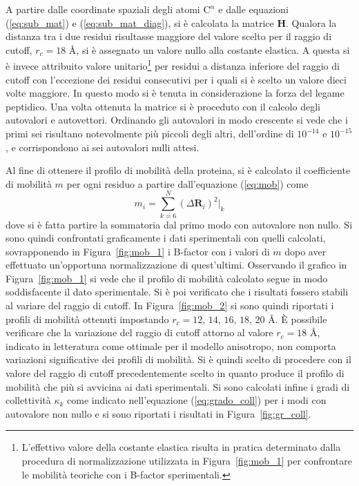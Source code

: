 A partire dalle coordinate spaziali degli atomi $ \mathrm{C}^{\alpha} $ e dalle equazioni (\ref{eq:sub_mat}) e (\ref{eq:sub_mat_diag}), si è calcolata la matrice $ \mathbf{H} $. Qualora la distanza tra i due residui risultasse maggiore del valore scelto per il raggio di cutoff,  $ r_{c} = 18 $ \AA, si è assegnato un valore nullo alla costante elastica. A questa si è invece attribuito valore unitario\footnote{L'effettivo valore della costante elastica risulta in pratica determinato dalla procedura di normalizzazione utilizzata in Figura~\ref{fig:mob_1} per confrontare le mobilità teoriche con i B-factor sperimentali.} 
per residui a distanza inferiore del raggio di cutoff con l'eccezione dei residui consecutivi per i quali si è scelto un valore dieci volte maggiore. In questo modo si è tenuta in considerazione la forza del legame peptidico. 
Una volta ottenuta la matrice si è proceduto con il calcolo degli autovalori e autovettori. Ordinando gli autovalori in modo crescente si vede che i primi sei risultano notevolmente più piccoli degli altri, dell'ordine di $ 10^{-14} $ e $ 10^{-15} $, e corrispondono ai sei autovalori nulli attesi. 

Al fine di ottenere il profilo di mobilità della proteina, si è calcolato il coefficiente di mobilità $ m $ per ogni residuo a partire dall'equazione (\ref{eq:mob}) come 
\begin{equation}
	m_i = \sum_{k=6}^{N} (\Delta \mathbf{R}_i)^2 \bigg|_k
\end{equation} 
dove si è fatta partire la sommatoria dal primo modo con autovalore non nullo. Si sono quindi confrontati graficamente i dati sperimentali con quelli calcolati, sovrapponendo in Figura~\ref{fig:mob_1} i B-factor con i valori di $ m $ dopo aver effettuato un'opportuna normalizzazione di quest'ultimi. Osservando il grafico in Figura~\ref{fig:mob_1} si vede che il profilo di mobilità calcolato segue in modo soddisfacente il dato sperimentale. Si è poi verificato che i risultati fossero stabili al variare del raggio di cutoff. In Figura~\ref{fig:mob_2} si sono quindi riportati i profili di mobilità ottenuti impostando $ r_{c} = 12, \, 14 , \, 16 , \, 18 , \,20$ \AA. È possibile verificare che la variazione del raggio di cutoff attorno al valore $ r_{c} =  18 $ \AA, indicato in letteratura come ottimale per il modello anisotropo, non comporta variazioni significative dei profili di mobilità. \cite{chem_rev}  Si è quindi scelto di procedere con il valore del raggio di cutoff precedentemente scelto in quanto produce il profilo di mobilità che più si avvicina ai dati sperimentali. 
Si sono calcolati infine i gradi di collettività $ \kappa_k $ come indicato nell'equazione (\ref{eq:grado_coll}) per i modi con autovalore non nullo e si sono riportati i risultati in Figura~\ref{fig:gr_coll}.

